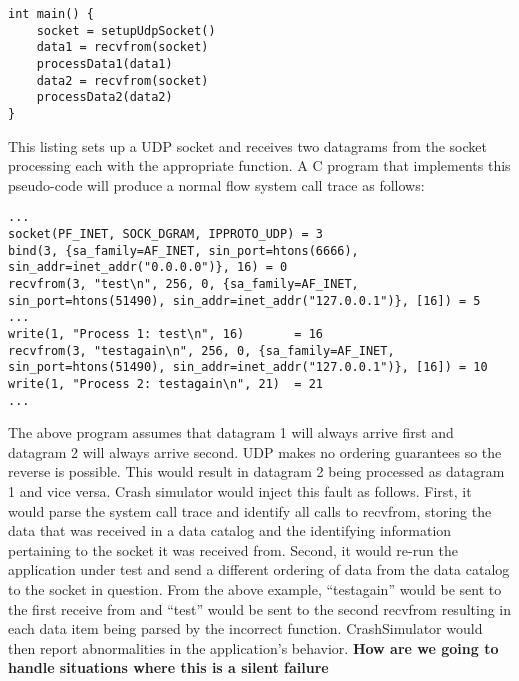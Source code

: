         \begin{verbatim}
int main() {
    socket = setupUdpSocket()
    data1 = recvfrom(socket)
    processData1(data1)
    data2 = recvfrom(socket)
    processData2(data2)
}
        \end{verbatim}

        This listing sets up a UDP socket and receives two datagrams from the socket processing each with the
        appropriate function. A C program that implements this pseudo-code will produce a normal flow system call trace
        as follows:

        \begin{verbatim}
...
socket(PF_INET, SOCK_DGRAM, IPPROTO_UDP) = 3
bind(3, {sa_family=AF_INET, sin_port=htons(6666), sin_addr=inet_addr("0.0.0.0")}, 16) = 0
recvfrom(3, "test\n", 256, 0, {sa_family=AF_INET, sin_port=htons(51490), sin_addr=inet_addr("127.0.0.1")}, [16]) = 5
...
write(1, "Process 1: test\n", 16)       = 16
recvfrom(3, "testagain\n", 256, 0, {sa_family=AF_INET, sin_port=htons(51490), sin_addr=inet_addr("127.0.0.1")}, [16]) = 10
write(1, "Process 2: testagain\n", 21)  = 21
...
        \end{verbatim}

        The above program assumes that datagram 1 will always arrive first and datagram 2 will always arrive second. UDP
        makes no ordering guarantees so the reverse is possible. This would result in datagram 2 being processed as
        datagram 1 and vice versa. Crash simulator would inject this fault as follows. First, it would parse the system
        call trace and identify all calls to recvfrom, storing the data that was received in a data catalog and the
        identifying information pertaining to the socket it was received from. Second, it would re-run the application
        under test and send a different ordering of data from the data catalog to the socket in question. From the above
        example, ``testagain'' would be sent to the first receive from and ``test'' would be sent to the second recvfrom
        resulting in each data item being parsed by the incorrect function. CrashSimulator would then report
        abnormalities in the application's behavior. \textbf{How are we going to handle situations where this is a
        silent failure}

